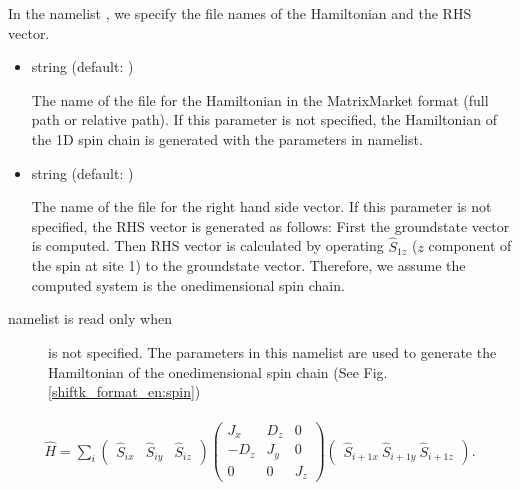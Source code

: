 \documentclass[letterpaper,10pt,dvipdfmx,openany,english]{sphinxmanual}
\begin{document}
In the namelist , we specify the file names of the
Hamiltonian and the RHS vector.
\begin{itemize}
\item {} 

 string (default: )

The name of the file for the Hamiltonian in the MatrixMarket format
(full path or relative path).
If this parameter is not specified,
the Hamiltonian of the 1D spin chain is generated
with the parameters in  namelist.

\item {} 

 string (default: )

The name of the file for the right hand side vector.
If this parameter is not specified,
the RHS vector is generated as follows:
First the ground\sphinxhyphen{}state vector is computed.
Then RHS vector is calculated by operating
\({\hat S}_{1 z}\) (\(z\) component of the spin at site 1)
to the ground\sphinxhyphen{}state vector.
Therefore, we assume the computed system is
the one\sphinxhyphen{}dimensional spin chain.

\end{itemize}
\begin{description}
\item[{ namelist is read only when}] \leavevmode
{} is not specified.
The parameters in this namelist are used to generate
the Hamiltonian of the one\sphinxhyphen{}dimensional spin chain (See Fig. \ref{shiftk_format_en:spin})

\end{description}
\begin{equation*}
\begin{split}\begin{align}
  {\hat H} = \sum_{i}
  \left(
  \begin{matrix}
    {\hat S}_{i x} & {\hat S}_{i y} & {\hat S}_{i z}
  \end{matrix}
  \right)
  \left(
  \begin{matrix}
    J_x & D_z & 0 \\
    -D_z & J_y & 0 \\
    0 & 0 & J_z
  \end{matrix}
  \right)
  \left(
  \begin{matrix}
    {\hat S}_{i+1 x} \ {\hat S}_{i+1 y} \ {\hat S}_{i+1 z}
  \end{matrix}
  \right).
  \end{align}\end{split}
\end{equation*}
\end{document}
